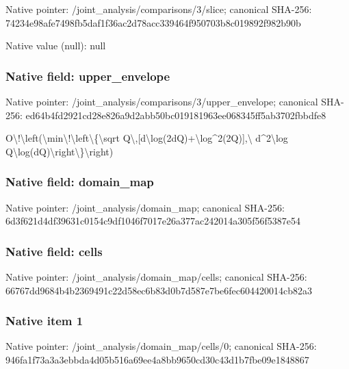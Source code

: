 \documentclass[10pt,a4paper]{article}
\begin{document}
Native pointer: /joint\_analysis/comparisons/3/slice; canonical SHA-256: 74234e98afe7498fb5daf1f3\allowbreak{}6ac2d78acc339464f950703b\allowbreak{}8c019892f982b90b



Native value (null): null



\subsubsection{Native field: upper\_envelope}


Native pointer: /joint\_analysis/comparis\allowbreak{}ons/3/upper\_envelope; canonical SHA-256: ed64b4fd2921cd28e826a9d2\allowbreak{}abb50bc019181963ee068345\allowbreak{}ff5ab3702fbbdfe8


O\textbackslash{}!\textbackslash{}left(\textbackslash{}min\textbackslash{}!\textbackslash{}left\textbackslash{}\{\textbackslash{}sqrt Q\textbackslash{},[d\textbackslash{}log(2dQ)+\textbackslash{}log\textasciicircum{}2(2Q)],\textbackslash{} d\textasciicircum{}2\textbackslash{}log Q\textbackslash{}log(dQ)\textbackslash{}right\textbackslash{}\}\textbackslash{}right)


\subsubsection{Native field: domain\_map}


Native pointer: /joint\_analysis/domain\_map; canonical SHA-256: 6d3f621d4df39631c0154c9d\allowbreak{}f1046f7017e26a377ac24201\allowbreak{}4a305f56f5387e54



\subsubsection{Native field: cells}


Native pointer: /joint\_analysis/domain\_map/cells; canonical SHA-256: 66767dd9684b4b2369491c22\allowbreak{}d58ec6b83d0b7d587e7be6fe\allowbreak{}c604420014cb82a3



\subsubsection{Native item 1}


Native pointer: /joint\_analysis/domain\_map/cells/0; canonical SHA-256: 946fa1f73a3a3ebbda4d05b5\allowbreak{}16a69ee4a8bb9650cd30c43d\allowbreak{}1b7fbe09e1848867
\end{document}
